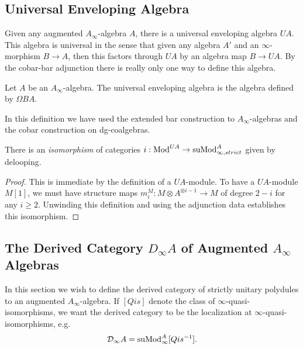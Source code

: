 \documentclass[../thesis.tex]{subfiles}
\begin{document}
        \subsection{Universal Enveloping Algebra}

            Given any augmented $A_\infty$-algebra $A$, there is a universal enveloping algebra $UA$. This algebra is universal in the sense that given any algebra $A'$ and an $\infty$-morphism  $B \rightarrow A$, then this factors through $UA$ by an algebra map $B \rightarrow UA$. By the cobar-bar adjunction there is really only one way to define this algebra.

            \begin{definition}
                Let $A$ be an $A_\infty$-algebra. The universal enveloping algebra is the algebra defined by $\Omega BA$.
            \end{definition}
            \begin{remark}
                In this definition we have used the extended bar construction to $A_\infty$-algebras and the cobar construction on dg-coalgebras.
            \end{remark}

            \begin{lemma}\label{lem: Polydules-are-modules}
                There is an \textit{isomorphism} of categories $i : \tt{Mod}^{UA} \rightarrow \tt{suMod}_{\infty, strict}^{A}$ given by delooping.
            \end{lemma}
            \begin{proof}
                This is immediate by the definition of a $UA$-module. To have a $UA$-module $M[1]$, we must have structure maps $m_i^M : M \otimes A^{\otimes i-1} \rightarrow M$ of degree $2-i$ for any $i \geq 2$. Unwinding this definition and using the adjunction data establishes this isomorphism.
            \end{proof}

        \subsection{The Derived Category $D_\infty A$ of Augmented $A_\infty$ Algebras} 

            In this section we wish to define the derived category of strictly unitary polydules to an augmented $A_\infty$-algebra. If $[Qis]$ denote the class of $\infty$-quasi-isomorphisms, we want the derived category to be the localization at $\infty$-quasi-isomorphisms, e.g.
            \begin{align*}
                \mathcal{D}_\infty A = \tt{suMod}_\infty^A[Qis^{-1}].
            \end{align*}
\end{document}
